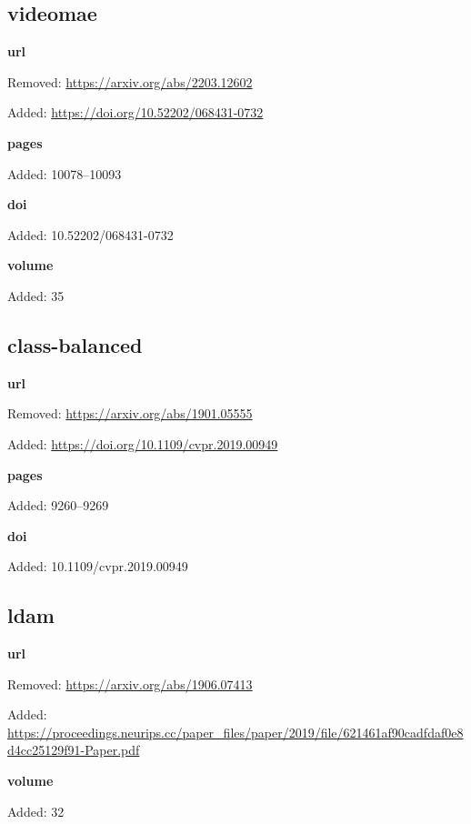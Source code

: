 \subsection*{videomae}
\noindent\textbf{url}\par
{\color{AuditRed}Removed: \url{https://arxiv.org/abs/2203.12602}\par}
{\color{AuditGreen}Added: \url{https://doi.org/10.52202/068431-0732}\par}
\noindent\textbf{pages}\par
{\color{AuditGreen}Added: 10078–10093\par}
\noindent\textbf{doi}\par
{\color{AuditGreen}Added: 10.52202/068431-0732\par}
\noindent\textbf{volume}\par
{\color{AuditGreen}Added: 35\par}
\medskip

\subsection*{class-balanced}
\noindent\textbf{url}\par
{\color{AuditRed}Removed: \url{https://arxiv.org/abs/1901.05555}\par}
{\color{AuditGreen}Added: \url{https://doi.org/10.1109/cvpr.2019.00949}\par}
\noindent\textbf{pages}\par
{\color{AuditGreen}Added: 9260–9269\par}
\noindent\textbf{doi}\par
{\color{AuditGreen}Added: 10.1109/cvpr.2019.00949\par}
\medskip

\subsection*{ldam}
\noindent\textbf{url}\par
{\color{AuditRed}Removed: \url{https://arxiv.org/abs/1906.07413}\par}
{\color{AuditGreen}Added: \url{https://proceedings.neurips.cc/paper_files/paper/2019/file/621461af90cadfdaf0e8d4cc25129f91-Paper.pdf}\par}
\noindent\textbf{volume}\par
{\color{AuditGreen}Added: 32\par}
\medskip

